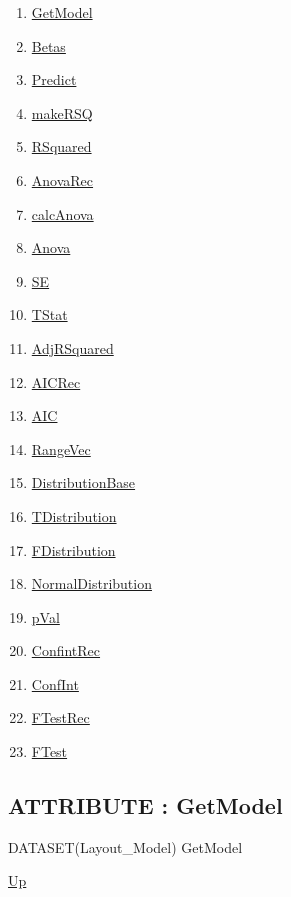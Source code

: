 \begin{enumerate}
\item \hyperlink{ecldoc:linearregression.ols.getmodel}{GetModel}
\item \hyperlink{ecldoc:linearregression.ols.betas}{Betas}
\item \hyperlink{ecldoc:linearregression.ols.predict}{Predict}
\item \hyperlink{ecldoc:linearregression.ols.makersq}{makeRSQ}
\item \hyperlink{ecldoc:linearregression.ols.rsquared}{RSquared}
\item \hyperlink{ecldoc:linearregression.ols.anovarec}{AnovaRec}
\item \hyperlink{ecldoc:linearregression.ols.calcanova}{calcAnova}
\item \hyperlink{ecldoc:linearregression.ols.anova}{Anova}
\item \hyperlink{ecldoc:linearregression.ols.se}{SE}
\item \hyperlink{ecldoc:linearregression.ols.tstat}{TStat}
\item \hyperlink{ecldoc:linearregression.ols.adjrsquared}{AdjRSquared}
\item \hyperlink{ecldoc:linearregression.ols.aicrec}{AICRec}
\item \hyperlink{ecldoc:linearregression.ols.aic}{AIC}
\item \hyperlink{ecldoc:linearregression.ols.rangevec}{RangeVec}
\item \hyperlink{ecldoc:linearregression.ols.distributionbase}{DistributionBase}
\item \hyperlink{ecldoc:linearregression.ols.tdistribution}{TDistribution}
\item \hyperlink{ecldoc:linearregression.ols.fdistribution}{FDistribution}
\item \hyperlink{ecldoc:linearregression.ols.normaldistribution}{NormalDistribution}
\item \hyperlink{ecldoc:linearregression.ols.pval}{pVal}
\item \hyperlink{ecldoc:linearregression.ols.confintrec}{ConfintRec}
\item \hyperlink{ecldoc:linearregression.ols.confint}{ConfInt}
\item \hyperlink{ecldoc:linearregression.ols.ftestrec}{FTestRec}
\item \hyperlink{ecldoc:linearregression.ols.ftest}{FTest}
\end{enumerate}
\subsection*{ATTRIBUTE : GetModel}
\hypertarget{ecldoc:linearregression.ols.getmodel}{}
\begin{minipage}[t]{\textwidth}
\begin{flushleft}
DATASET(Layout\_Model) GetModel 
\end{flushleft}
\end{minipage}
\hyperlink{ecldoc:linearregression.ols}{Up}

